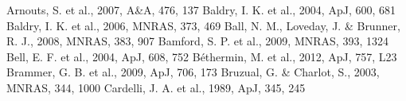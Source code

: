 \documentclass{mn2e}
\begin{document}
\begin{thebibliography}{}
 Arnouts, S. et al., 2007, A\&A, 476, 137
 Baldry, I. K. et al., 2004, ApJ, 600, 681
 Baldry, I. K. et al., 2006, MNRAS, 373, 469
 Ball, N. M., Loveday, J. \& Brunner, R. J., 2008, MNRAS, 383, 907
 Bamford, S. P. et al., 2009, MNRAS, 393, 1324
 Bell, E. F. et al., 2004, ApJ, 608, 752
 B\'ethermin, M. et al., 2012, ApJ, 757, L23
 Brammer, G. B. et al., 2009, ApJ, 706, 173
 Bruzual, G. \& Charlot, S., 2003, MNRAS, 344, 1000
 Cardelli, J. A. et al., 1989, ApJ, 345, 245

\end{thebibliography}
\end{document}
